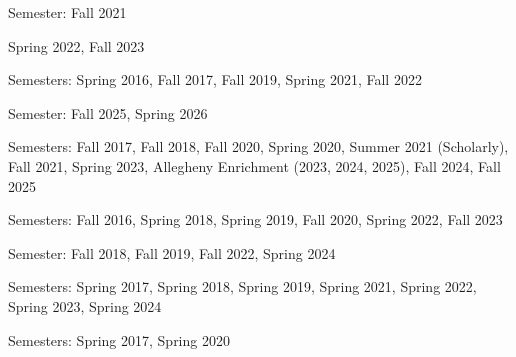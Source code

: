 \documentclass[11pt,a4paper]{moderncv}
\begin{document}
{Semester: Fall 2021}{}{}{}

{Spring 2022, Fall 2023}{}{}{}


{Semesters: Spring 2016, Fall 2017, Fall 2019, Spring 2021, Fall 2022}{}{}{}

{Semester: Fall 2025, Spring 2026}{}{}{}


{Semesters: Fall 2017, Fall 2018, Fall 2020, Spring 2020, Summer 2021 (Scholarly), Fall 2021, Spring 2023, Allegheny Enrichment (2023, 2024, 2025), Fall 2024, Fall 2025}{}{}{}

{Semesters: Fall 2016, Spring 2018, Spring 2019, Fall 2020, Spring 2022, Fall 2023}{}{}{}


{Semester: Fall 2018, Fall 2019, Fall 2022, Spring 2024}{}{}{}


{Semesters: Spring 2017, Spring 2018, Spring 2019, Spring 2021, Spring 2022, Spring 2023, Spring 2024}{}{}{}


{Semesters: Spring 2017, Spring 2020}{}{}{}
\end{document}
